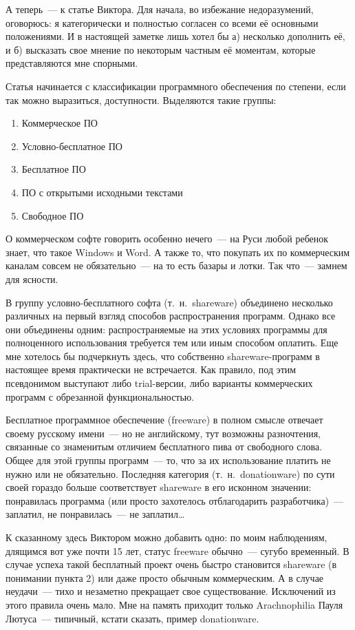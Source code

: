 А теперь~--- к статье Виктора. Для начала, во избежание недоразумений, оговорюсь: я категорически и полностью согласен со всеми её основными положениями. И в настоящей заметке лишь хотел бы а) несколько дополнить её, и б) высказать свое мнение по некоторым частным её моментам, которые представляются мне спорными.

Статья начинается с классификации программного обеспечения по степени, если так можно выразиться, доступности. Выделяются такие группы:

\begin{enumerate}
\item Коммерческое ПО 
\item Условно-бесплатное ПО 
\item Бесплатное ПО 
\item ПО с открытыми исходными текстами 
\item Свободное ПО 
\end{enumerate}

О коммерческом софте говорить особенно нечего~--- на Руси любой ребенок знает, что такое Windows и Word. А также то, что покупать их по коммерческим каналам совсем не обязательно~--- на то есть базары и лотки. Так что~--- замнем для ясности.

В группу условно-бесплатного софта (т.~н.~shareware) объединено несколько различных на первый взгляд способов распространения программ. Однако все они объединены одним: распространяемые на этих условиях программы для полноценного использования требуется тем или иным способом оплатить. Еще мне хотелось бы подчеркнуть здесь, что собственно shareware-программ в настоящее время практически не встречается. Как правило, под этим псевдонимом выступают либо trial-версии, либо варианты коммерческих программ с обрезанной функциональностью.

Бесплатное программное обеспечение (freeware) в полном смысле отвечает своему русскому имени~--- но не английскому, тут возможны разночтения, связанные со знаменитым отличием бесплатного пива от свободного слова. Общее для этой группы программ~--- то, что за их использование платить не нужно или не обязательно. Последняя категория (т.~н.~donationware) по сути своей гораздо больше соответствует shareware в его исконном значении: понравилась программа (или просто захотелось отблагодарить разработчика)~--- заплатил, не понравилась~--- не заплатил\dots

К сказанному здесь Виктором можно добавить одно: по моим наблюдениям, длящимся вот уже почти 15 лет, статус freeware обычно~--- сугубо временный. В случае успеха такой бесплатный проект очень быстро становится shareware (в понимании пункта 2) или даже просто обычным коммерческим. А в случае неудачи~--- тихо и незаметно прекращает свое существование. Исключений из этого правила очень мало. Мне на память приходит только Arachnophilia Пауля Лютуса~--- типичный, кстати сказать, пример donationware.

